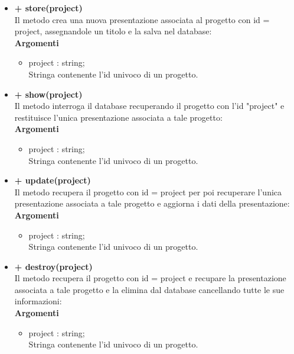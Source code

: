 		\begin{itemize}
			\item \textbf{+ store(project)}\\
			Il metodo crea una nuova presentazione associata al progetto con id = project, assegnandole un titolo e la salva nel database:\\
			\textbf{Argomenti}
			\begin{itemize}
				\item project : string; \\
				Stringa contenente l'id univoco di un progetto.
			\end{itemize}
			\item \textbf{+ show(project)}\\
			Il metodo interroga il database recuperando il progetto con l'id "project" e restituisce l'unica presentazione associata a tale progetto:\\
			\textbf{Argomenti}
			\begin{itemize}
				\item project : string; \\
				Stringa contenente l'id univoco di un progetto.
			\end{itemize}
			\item \textbf{+ update(project)}\\
			Il metodo recupera il progetto con id = project per poi recuperare l'unica presentazione associata a tale progetto e aggiorna i dati della presentazione:\\
			\textbf{Argomenti}
			\begin{itemize}
				\item project : string; \\
				Stringa contenente l'id univoco di un progetto.
			\end{itemize}
			\item \textbf{+ destroy(project)}\\
			Il metodo recupera il progetto con id = project e recupare la presentazione associata a tale progetto e la elimina dal database cancellando tutte le sue informazioni:\\
			\textbf{Argomenti}
			\begin{itemize}
				\item project : string; \\
				Stringa contenente l'id univoco di un progetto.
			\end{itemize}
		\end{itemize}
		
\newpage
